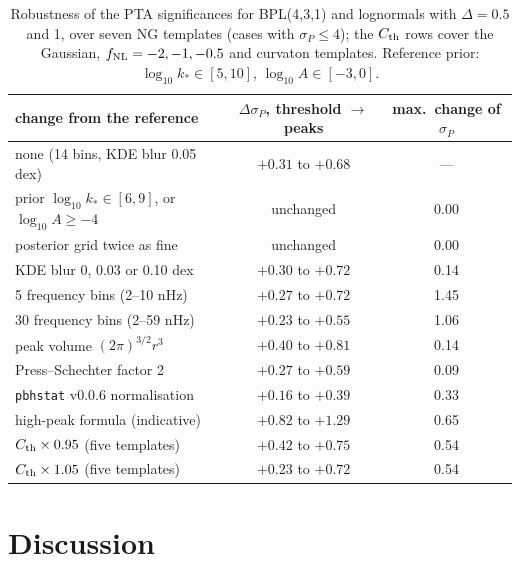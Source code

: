 \documentclass[11pt,a4paper]{article}
\newcommand{\fnl}{f_{\rm NL}}
\begin{document}
\begin{table}[t]
\centering\small
\begin{tabular}{lcc}
\toprule
change from the reference & $\Delta\sigma_P$, threshold $\to$ peaks & max.\ change of $\sigma_P$\\
\midrule
none (14 bins, KDE blur 0.05 dex) & $+0.31$ to $+0.68$ & ---\\
prior $\log_{10}k_*\in[6,9]$, or $\log_{10}A\ge-4$ & unchanged & 0.00\\
posterior grid twice as fine & unchanged & 0.00\\
KDE blur 0, 0.03 or 0.10 dex & $+0.30$ to $+0.72$ & 0.14\\
5 frequency bins (2--10 nHz) & $+0.27$ to $+0.72$ & 1.45\\
30 frequency bins (2--59 nHz) & $+0.23$ to $+0.55$ & 1.06\\
peak volume $(2\pi)^{3/2}r^3$ & $+0.40$ to $+0.81$ & 0.14\\
Press--Schechter factor 2 & $+0.27$ to $+0.59$ & 0.09\\
\texttt{pbhstat} v0.0.6 normalisation & $+0.16$ to $+0.39$ & 0.33\\
high-peak formula \cite{Iovino24} (indicative) & $+0.82$ to $+1.29$ & 0.65\\
$C_{\rm th}\times0.95$ (five templates) & $+0.42$ to $+0.75$ & 0.54\\
$C_{\rm th}\times1.05$ (five templates) & $+0.23$ to $+0.72$ & 0.54\\
\bottomrule
\end{tabular}
\caption{Robustness of the PTA significances for BPL(4,3,1) and lognormals with $\Delta=0.5$ and 1,
over seven NG templates (cases with $\sigma_P\le4$); the $C_{\rm th}$ rows cover the Gaussian,
$\fnl=-2,-1,-0.5$ and curvaton templates. Reference prior: $\log_{10}k_*\in[5,10]$,
$\log_{10}A\in[-3,0]$.}
\label{tab:robust}
\end{table}

\section{Discussion}
\end{document}
